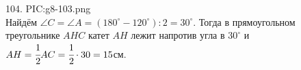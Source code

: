 104. {{PIC:g8-103.png}}\\
Найдём $\angle C=\angle A=(180^\circ-120^\circ):2=30^\circ.$ Тогда в прямоугольном треугольнике $AHC$ катет $AH$ лежит напротив угла в $30^\circ$ и
$AH=\cfrac{1}{2}AC=\cfrac{1}{2}\cdot30=15$см.\\
